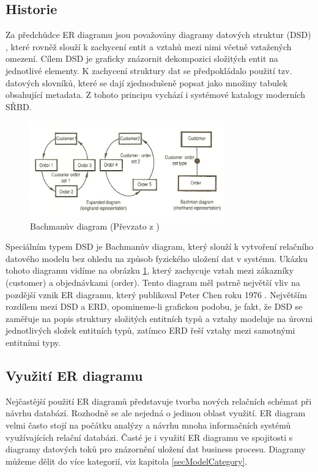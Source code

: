 \documentclass[czech,bachelor,public,dept460,male,oneside]{diploma}
\begin{document}
	\subsection{Historie}
	Za předchůdce ER diagramu jsou považovány diagramy datových struktur (DSD) \cite{bachmanDsd}, které rovněž slouží k zachycení entit a vztahů mezi nimi včetně vztažených omezení. Cílem DSD je graficky znázornit dekompozici složitých entit na jednotlivé elementy. K zachycení struktury dat se předpokládalo použití tzv. datových slovníků, které se dají zjednodušeně popsat jako množiny tabulek obsahující metadata. Z tohoto principu vychází i systémové katalogy moderních SŘBD.
	
	\begin{figure}[!h]
		\centering
		\includegraphics[width=0.75\textwidth]{Figures/BachmanDiagram}
		\caption[Bachmanův diagram]{Bachmanův diagram (Převzato z \cite{wikiDsd})}
		\label{fig:bachmanDiag}
	\end{figure}
	
	Speciálním typem DSD je Bachmanův diagram, který slouží k vytvoření relačního datového modelu bez ohledu na způsob fyzického uložení dat v systému. Ukázku tohoto diagramu vidíme na obrázku \ref{fig:bachmanDiag}, který zachycuje vztah mezi zákazníky (customer) a objednávkami (order). Tento diagram měl patrně největší vliv na pozdější vznik ER diagramu, který publikoval Peter Chen roku 1976 \cite{chenERD}.
	Největším rozdílem mezi DSD a ERD, opomineme-li grafickou podobu, je fakt, že DSD se zaměřuje na popis struktury složitých entitních typů a vztahy modeluje na úrovni jednotlivých složek entitních typů, zatímco ERD řeší vztahy mezi samotnými entitními typy. 
		
	\subsection{Využití ER diagramu}
	Nejčastější použití ER diagramů představuje tvorba nových relačních schémat při návrhu databází. Rozhodně se ale nejedná o jedinou oblast využití. ER diagram velmi často stojí na počátku analýzy a návrhu mnoha informačních systémů využívajících relační databázi. Časté je i využití ER diagramu ve spojitosti s diagramy datových toků pro znázornění uložení dat business procesu. Diagramy můžeme dělit do více kategorií, viz kapitola \ref{secModelCategory}.
	
\end{document}
